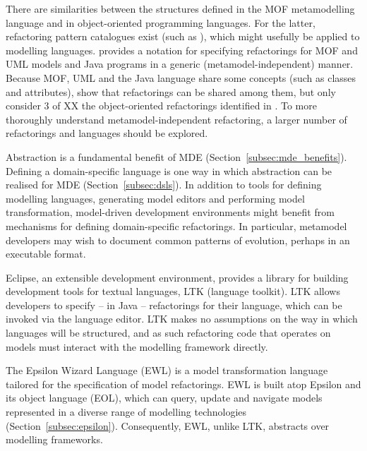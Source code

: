 There are similarities between the structures defined in the MOF metamodelling language and in object-oriented programming languages. For the latter, refactoring pattern catalogues exist (such as \cite{fowler99refactoring}), which might usefully be applied to modelling languages. \cite{moha09refactoring} provides a notation for specifying refactorings for MOF and UML models and Java programs in a generic (metamodel-independent) manner. Because MOF, UML and the Java language share some concepts (such as classes and attributes), \cite{moha09refactoring} show that refactorings can be shared among them, but only consider 3 of XX the object-oriented refactorings identified in \cite{fowler99refactoring}. To more thoroughly understand metamodel-independent refactoring, a larger number of refactorings and languages should be explored.

Abstraction is a fundamental benefit of MDE (Section~\ref{subsec:mde_benefits}). Defining a domain-specific language is one way in which abstraction can be realised for MDE (Section~\ref{subsec:dsls}). In addition to tools for defining modelling languages, generating model editors and performing model transformation, model-driven development environments might benefit from mechanisms for defining domain-specific refactorings. In particular, metamodel developers may wish to document common patterns of evolution, perhaps in an executable format.

Eclipse, an extensible development environment, provides a library for building development tools for textual languages, LTK (language toolkit). LTK allows developers to specify -- in Java -- refactorings for their language, which can be invoked via the language editor. LTK makes no assumptions on the way in which languages will be structured, and as such refactoring code that operates on models must interact with the modelling framework directly.

The Epsilon Wizard Language (EWL) \cite{kolovos07ewl} is a model transformation language tailored for the specification of model refactorings. EWL is built atop Epsilon and its object language (EOL), which can query, update and navigate models represented in a diverse range of modelling technologies (Section~\ref{subsec:epsilon}). Consequently, EWL, unlike LTK, abstracts over modelling frameworks.

